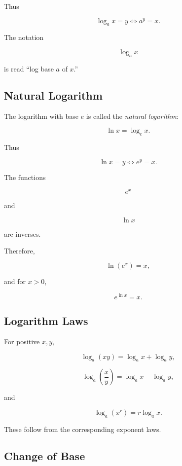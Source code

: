 Thus

\[ \log_a x=y\iff a^y=x. \]

The notation

\[ \log_a x \]

is read ``log base \(a\) of \(x\).''

\subsection{Natural Logarithm}
\label{subsec:natural-logarithm}

The logarithm with base \(e\) is called the \emph{natural logarithm}:

\[ \ln x=\log_e x. \]

Thus

\[ \ln x=y\iff e^y=x. \]

The functions

\[ e^x \]

and

\[ \ln x \]

are inverses.

Therefore,

\[ \ln(e^x)=x, \]

and for \(x>0\),

\[ e^{\ln x}=x. \]

\subsection{Logarithm Laws}
\label{subsec:log-laws}

For positive \(x,y\),

\[ \log_a(xy)=\log_a x+\log_a y, \]

\[ \log_a\left(\frac{x}{y}\right)=\log_a x-\log_a y, \]

and

\[ \log_a(x^r)=r\log_a x. \]

These follow from the corresponding exponent laws.

\subsection{Change of Base}
\label{subsec:change-of-base}

